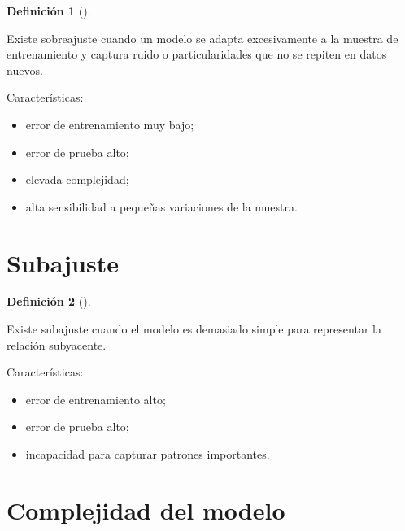\documentclass[
  spanish,
  10.5pt,
  letterpaper,
  DIV=11,
  numbers=noendperiod,
  oneside,
  open=any]{scrreprt}
\providecommand{\tightlist}{%
  \setlength{\itemsep}{0pt}\setlength{\parskip}{0pt}}
\theoremstyle{definition}
\newtheorem{definition}{Definición}[chapter]
\theoremstyle{definition}
\theoremstyle{plain}
\theoremstyle{remark}
\begin{document}

\begin{definition}[]\protect\hypertarget{def-sobreajuste}{}\label{def-sobreajuste}

Existe sobreajuste cuando un modelo se adapta excesivamente a la muestra
de entrenamiento y captura ruido o particularidades que no se repiten en
datos nuevos.

\end{definition}

Características:

\begin{itemize}
\tightlist
\item
  error de entrenamiento muy bajo;
\item
  error de prueba alto;
\item
  elevada complejidad;
\item
  alta sensibilidad a pequeñas variaciones de la muestra.
\end{itemize}

\section*{Subajuste}\label{subajuste}


\begin{definition}[]\protect\hypertarget{def-subajuste}{}\label{def-subajuste}

Existe subajuste cuando el modelo es demasiado simple para representar
la relación subyacente.

\end{definition}

Características:

\begin{itemize}
\tightlist
\item
  error de entrenamiento alto;
\item
  error de prueba alto;
\item
  incapacidad para capturar patrones importantes.
\end{itemize}

\section*{Complejidad del modelo}\label{complejidad-del-modelo}

\end{document}
